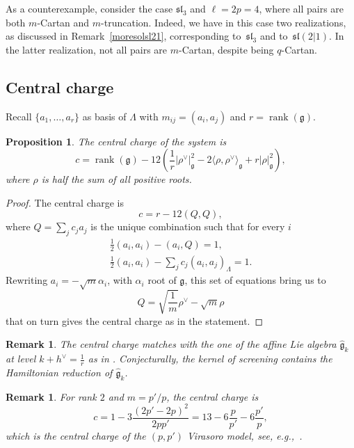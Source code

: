 \documentclass[10pt,a4paper]{amsart}
\numberwithin{equation}{section}
\newtheorem{prop}[teo]{Proposition}
\newtheorem{oss}[teo]{Remark} }
\begin{document}
As a counterexample, consider the case $\mathfrak{sl}_3$ and $\ell=2p=4$, where all pairs are both $m$-Cartan and $m$-truncation. Indeed, we have in this case two realizations, as discussed in Remark~\ref{moresolsl21}, corresponding to~$\mathfrak{sl}_3$ and to~$\mathfrak{sl}(2|1)$. In the latter realization, not all pairs are $m$-Cartan, despite being $q$-Cartan.

\subsection{Central charge}
Recall $\{a_1, \dots, a_r\}$ as basis of $\Lambda$ with $m_{ij} = (a_i,a_j)$ and $r=\operatorname{rank}(\mathfrak{g})$.

\begin{prop} The central charge of the system is
\begin{equation*}
c= \operatorname{rank}(\mathfrak{g}) -12\left(\frac{1}{r}\big|\rho^\vee\big|_\mathfrak{g}^2-2\big\langle\rho, \rho^\vee\big\rangle_\mathfrak{g}+r |\rho |_\mathfrak{g}^2\right),
\end{equation*}
where $\rho$ is half the sum of all positive roots.
\end{prop}
\begin{proof}
The central charge is
\[
c = r - 12(Q, Q),
\] where $Q=\sum_j c_ja_j$ is the unique combination such that for every $i$
\begin{gather*}%
\frac{1}{2}(a_i,a_i) -(a_i,Q) =1,\\
\frac{1}{2}(a_i,a_i) -\sum_j c_j(a_i,a_j)_\Lambda =1.
\end{gather*}
Rewriting $a_i = -\sqrt{m}\alpha_i$, with $\alpha_i$ root of $\mathfrak{g}$, this set of equations bring us to
\begin{equation*}
Q= \sqrt{\frac{1}{m}}\rho^\vee-\sqrt{m}\rho
\end{equation*}
that on turn gives the central charge as in the statement.
\end{proof}

\begin{oss}
The central charge matches with the one of the affine Lie algebra $\hat{\mathfrak{g}}_k$ at level $k+h^\vee= \frac{1}{r}$ as in \cite{Arak07}. Conjecturally, the kernel of screening contains the Hamiltonian reduction of $\hat{\mathfrak{g}}_k$.
\end{oss}
\begin{oss} For rank $2$ and $m=p'/p$, the central charge is
\[ c= 1-3 \frac{(2p'-2p)^2}{2pp'} = 13 -6\frac{p}{p'}- 6\frac{p'}{p},
\] which is the central charge of the $(p,p')$ Virasoro model, see, e.g.,~\cite{TW13}.
\end{oss}
\end{document}
